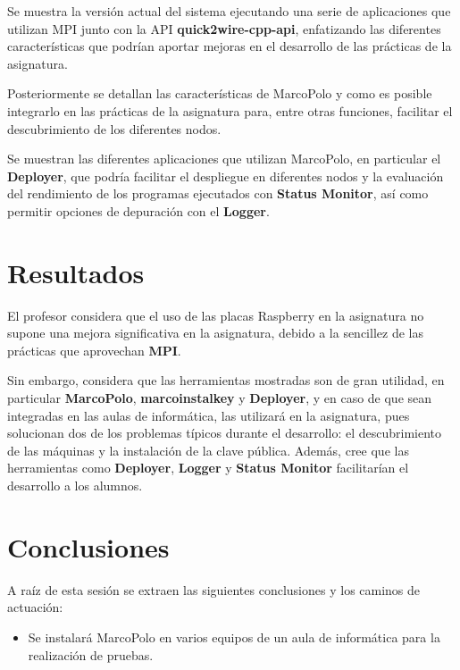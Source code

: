 Se muestra la versión actual del sistema ejecutando una serie de aplicaciones que utilizan MPI junto con la API \textbf{quick2wire-cpp-api}, enfatizando las diferentes características que podrían aportar mejoras en el desarrollo de las prácticas de la asignatura.

Posteriormente se detallan las características de MarcoPolo y como es posible integrarlo en las prácticas de la asignatura para, entre otras funciones, facilitar el descubrimiento de los diferentes nodos.

Se muestran las diferentes aplicaciones que utilizan MarcoPolo, en particular el \textbf{Deployer}, que podría facilitar el despliegue en diferentes nodos y la evaluación del rendimiento de los programas ejecutados con \textbf{Status Monitor}, así como permitir opciones de depuración con el \textbf{Logger}.


\section{Resultados}

El profesor considera que el uso de las placas Raspberry en la asignatura no supone una mejora significativa en la asignatura, debido a la sencillez de las prácticas que aprovechan \textbf{MPI}.

Sin embargo, considera que las herramientas mostradas son de gran utilidad, en particular \textbf{MarcoPolo}, \textbf{marcoinstalkey} y \textbf{Deployer}, y en caso de que sean integradas en las aulas de informática, las utilizará en la asignatura, pues solucionan dos de los problemas típicos durante el desarrollo: el descubrimiento de las máquinas y la instalación de la clave pública. Además, cree que las herramientas como \textbf{Deployer}, \textbf{Logger} y \textbf{Status Monitor} facilitarían el desarrollo a los alumnos.

\section{Conclusiones}

A raíz de esta sesión se extraen las siguientes conclusiones y los caminos de actuación:

\begin{itemize}
	\item Se instalará MarcoPolo en varios equipos de un aula de informática para la realización de pruebas.
\end{itemize}


